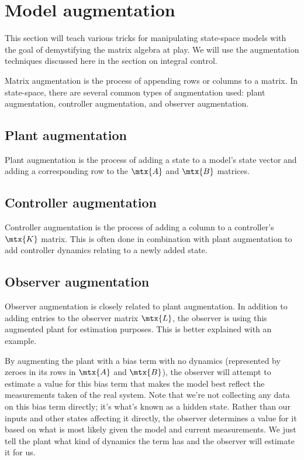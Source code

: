 \section{Model augmentation}

This section will teach various tricks for manipulating state-space
\glspl{model} with the goal of demystifying the matrix algebra at play. We will
use the augmentation techniques discussed here in the section on integral
control.

Matrix augmentation is the process of appending rows or columns to a matrix. In
state-space, there are several common types of augmentation used: \gls{plant}
augmentation, controller augmentation, and \gls{observer} augmentation.

\subsection{Plant augmentation}

Plant augmentation is the process of adding a state to a model's state vector
and adding a corresponding row to the $\mtx{A}$ and $\mtx{B}$ matrices.

\subsection{Controller augmentation}

Controller augmentation is the process of adding a column to a controller's
$\mtx{K}$ matrix. This is often done in combination with \gls{plant}
augmentation to add controller dynamics relating to a newly added \gls{state}.

\subsection{Observer augmentation}

Observer augmentation is closely related to \gls{plant} augmentation. In
addition to adding entries to the \gls{observer} matrix $\mtx{L}$, the
\gls{observer} is using this augmented \gls{plant} for estimation purposes. This
is better explained with an example.

By augmenting the \gls{plant} with a bias term with no dynamics (represented by
zeroes in its rows in $\mtx{A}$ and $\mtx{B}$), the \gls{observer} will attempt
to estimate a value for this bias term that makes the \gls{model} best reflect
the measurements taken of the real \gls{system}. Note that we're not collecting
any data on this bias term directly; it's what's known as a hidden \gls{state}.
Rather than our \glspl{input} and other \glspl{state} affecting it directly, the
\gls{observer} determines a value for it based on what is most likely given the
\gls{model} and current measurements. We just tell the \gls{plant} what kind of
dynamics the term has and the \gls{observer} will estimate it for us.

